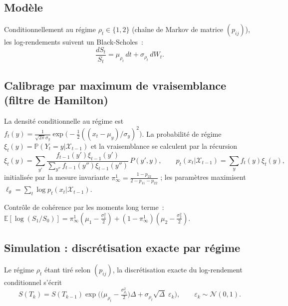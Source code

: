 \documentclass[11pt,a4paper]{article}
\begin{document}
\subsection{Modèle}
\begin{definitionbox}
Conditionnellement au régime $\rho_t\in\{1,2\}$ (chaîne de Markov de matrice $(p_{ij})$), les log-rendements suivent un Black-Scholes~:
\[
\frac{dS_t}{S_t}=\mu_{\rho_t}\,dt+\sigma_{\rho_t}\,dW_t .
\]
\end{definitionbox}

\subsection{Calibrage par maximum de vraisemblance (filtre de Hamilton)}
\begin{definitionbox}
La densité conditionnelle au régime est $f_t(y)=\tfrac{1}{\sqrt{2\pi}\sigma_y}\exp\!\big(-\tfrac12((x_t-\mu_y)/\sigma_y)^2\big)$. La probabilité de régime $\xi_t(y)=\mathbb P(Y_t=y|\mathcal X_{t-1})$ et la vraisemblance se calculent par la récursion
\[
\xi_t(y)=\sum_{y'}\frac{f_{t-1}(y')\xi_{t-1}(y')}{\sum_{y''}f_{t-1}(y'')\xi_{t-1}(y'')}\,P(y',y),
\qquad
p_t(x_t|\mathcal X_{t-1})=\sum_y f_t(y)\xi_t(y),
\]
initialisée par la mesure invariante $\pi^1_\infty=\tfrac{1-p_{22}}{2-p_{11}-p_{22}}$ ; les paramètres maximisent $\ell_\theta=\sum_t\log p_t(x_t|\mathcal X_{t-1})$.
\end{definitionbox}
Contrôle de cohérence par les moments long terme~: $\mathbb E[\log(S_1/S_0)]=\pi^1_\infty(\mu_1-\tfrac{\sigma_1^2}{2})+(1-\pi^1_\infty)(\mu_2-\tfrac{\sigma_2^2}{2})$.

\subsection{Simulation : discrétisation exacte par régime}
\begin{definitionbox}
Le régime $\rho_t$ étant tiré selon $(p_{ij})$, la discrétisation exacte du log-rendement conditionnel s'écrit
\[
S(T_k)=S(T_{k-1})\exp\!\Big(\big(\mu_{\rho_t}-\tfrac{\sigma_{\rho_t}^2}{2}\big)\Delta+\sigma_{\rho_t}\sqrt{\Delta}\;\varepsilon_k\Big),\qquad \varepsilon_k\sim\mathcal N(0,1).
\]
\end{definitionbox}
\end{document}

